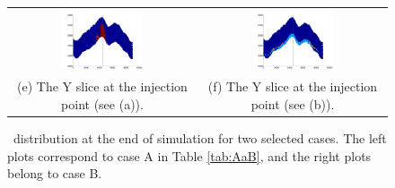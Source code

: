 \begin{figure}
\begin{tabular}{cc}
\includegraphics[width=0.45\textwidth]{./figurer/C02222_CO2atEOS_slcy}&
\includegraphics[width=0.45\textwidth]{./figurer/C03211_CO2atEOS_slcy}
\\(e) The Y slice at the injection point (see (a)).&
(f) The Y slice at the injection point (see (b)).
\end{tabular}
\caption{\coo\ distribution at the end of simulation for two selected cases. The left plots correspond to case A in Table \ref{tab:AaB}, and the right plots belong to case B.}
\label{fig:COEOS}
\end{figure}

